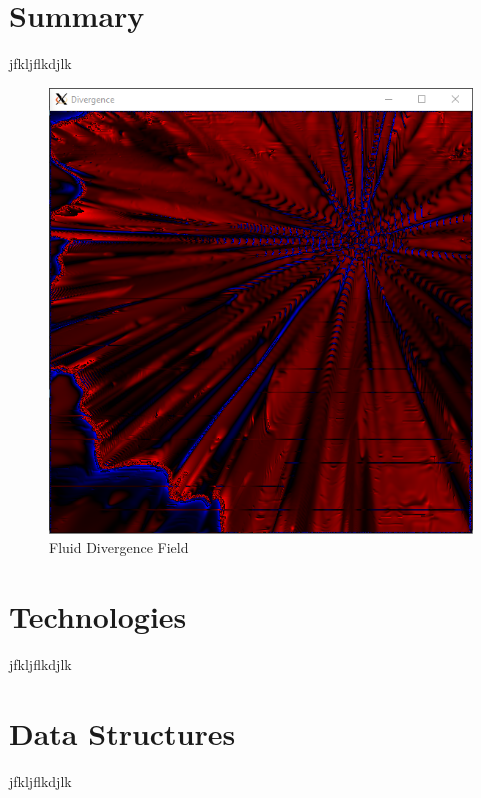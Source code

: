 \documentclass[
10pt, %
letterpaper, %
oneside, %
headinclude,footinclude, %
BCOR5mm, %
]{scrartcl}
\title{\normalfont{Fluid Simulation on CUDA GPUs}}
\subtitle{Johns Hopkins University: EN.605.617.81.SP23 Introduction to GPU Programming }
\author{\spacedlowsmallcaps{Nate Lao (nlao1@jh.edu)}}
\date{May 7th 2023}
\begin{document}
\maketitle

\section{Summary} %
jfkljflkdjlk

\begin{figure}[h]
    \centering
    \includegraphics[scale=0.5]{../png/divergence_example.PNG}
    \caption{Fluid Divergence Field}
\end{figure}

\pagebreak

\section{Technologies} %
jfkljflkdjlk

\pagebreak
\section{Data Structures} %
jfkljflkdjlk
\end{document}
